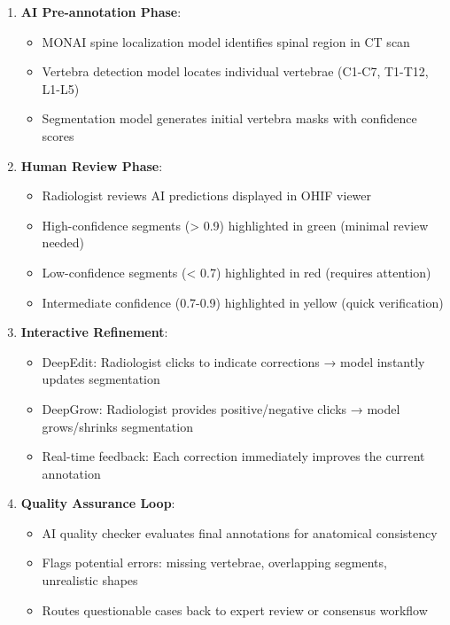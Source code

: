 \begin{enumerate}
    \item \textbf{AI Pre-annotation Phase}:
    \begin{itemize}
        \item MONAI spine localization model identifies spinal region in CT scan
        \item Vertebra detection model locates individual vertebrae (C1-C7, T1-T12, L1-L5)
        \item Segmentation model generates initial vertebra masks with confidence scores
    \end{itemize}
    
    \item \textbf{Human Review Phase}:
    \begin{itemize}
        \item Radiologist reviews AI predictions displayed in OHIF viewer
        \item High-confidence segments (> 0.9) highlighted in green (minimal review needed)
        \item Low-confidence segments (< 0.7) highlighted in red (requires attention)
        \item Intermediate confidence (0.7-0.9) highlighted in yellow (quick verification)
    \end{itemize}
    
    \item \textbf{Interactive Refinement}:
    \begin{itemize}
        \item DeepEdit: Radiologist clicks to indicate corrections → model instantly updates segmentation
        \item DeepGrow: Radiologist provides positive/negative clicks → model grows/shrinks segmentation
        \item Real-time feedback: Each correction immediately improves the current annotation
    \end{itemize}
    
    \item \textbf{Quality Assurance Loop}:
    \begin{itemize}
        \item AI quality checker evaluates final annotations for anatomical consistency
        \item Flags potential errors: missing vertebrae, overlapping segments, unrealistic shapes
        \item Routes questionable cases back to expert review or consensus workflow
    \end{itemize}
\end{enumerate}

